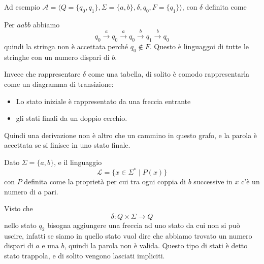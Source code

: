 \documentclass[12pt]{report}
\begin{document}
\begin{tcolorbox}
	Ad esempio $\mathscr{A} = \langle Q = \{ q_0, q_1 \}, \Sigma = \{ a, b \}, \delta, q_0, F = \{ q_1 \} \rangle$, con $\delta$ definita come
	\begin{center}
	\end{center}
	Per $aabb$ abbiamo
	$$ q_0 \overset{a}{\rightarrow} q_0 \overset{a}{\rightarrow} q_0 \overset{b}{\rightarrow} q_1 \overset{b}{\rightarrow} q_0 $$
	quindi la stringa non è accettata perché $q_0 \not \in F$.
	Questo è linguaggoi di tutte le stringhe con un numero dispari di $b$.
\end{tcolorbox}
Invece che rappresentare $\delta$ come una tabella, di solito è comodo rappresentarla come un diagramma di transizione:
\begin{itemize}
	\item Lo stato iniziale è rappresentato da una freccia entrante
	\item gli stati finali da un doppio cerchio.
\end{itemize}
Quindi una derivazione non è altro che un cammino in questo grafo, e la parola è accettata se si finisce in uno stato finale.

\begin{tcolorbox}
	Dato $\Sigma = \{ a, b \}$, e il linguaggio 
	$$ \mathscr{L} = \{ x \in \Sigma^* \mid P(x) \}$$
	con $P$ definita come la proprietà per cui tra ogni coppia di $b$ successive in $x$ c'è un numero di $a$ pari.
	\begin{center}
	\end{center}
	Visto che 
	$$ \delta : Q \times \Sigma \rightarrow Q $$
	nello stato $q_2$ bisogna aggiungere una freccia ad uno stato da cui non si può uscire, infatti se siamo in quello stato vuol dire che abbiamo trovato un numero dispari di $a$ e una $b$, quindi la parola non è valida.
	Questo tipo di stati è detto stato trappola, e di solito vengono lasciati impliciti.
\end{tcolorbox}
\end{document}
